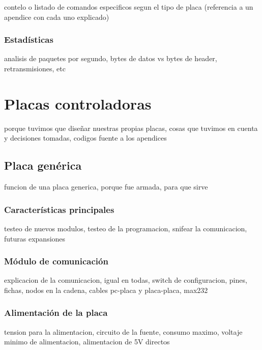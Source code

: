 contelo o listado de comandos especificos segun el tipo de placa (referencia a un apendice con cada uno explicado)

\subsubsection{Estad\'isticas}
\label{h_comm_protocolo_estadisticas}

analisis de paquetes por segundo, bytes de datos vs bytes de header, retransmisiones, etc

\section{Placas controladoras}
\label{h_placas}

porque tuvimos que diseñar nuestras propias placas, cosas que tuvimos en cuenta y decisiones tomadas, codigos fuente a los apendices

\subsection{Placa gen\'erica}
\label{h_placas_generica}

funcion de una placa generica, porque fue armada, para que sirve

\subsubsection{Caracter\'isticas principales}
\label{h_placas_generica_caracteristicas}

testeo de nuevos modulos, testeo de la programacion, snifear la comunicacion, futuras expansiones

\subsubsection{M\'odulo de comunicaci\'on}
\label{h_placas_generica_comm}

explicacion de la comunicacion, igual en todas, switch de configuracion, pines, fichas, nodos en la cadena, cables pc-placa y placa-placa, max232

\subsubsection{Alimentaci\'on de la placa}
\label{h_placas_generica_alimentacion}

tension para la alimentacion, circuito de la fuente, consumo maximo, voltaje minimo de alimentacion, alimentacion de 5V directos

